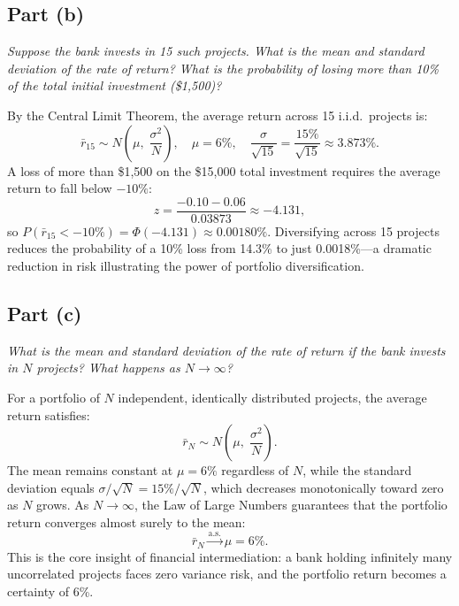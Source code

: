 \documentclass[a4paper]{article}
\begin{document}
\subsection{Part (b)}

\textit{Suppose the bank invests in 15 such projects. What is the mean and
standard deviation of the rate of return? What is the probability of losing
more than 10\% of the total initial investment (\$1,500)?}

\medskip
By the Central Limit Theorem, the average return across 15 i.i.d.\ projects
is:
\[
\bar{r}_{15} \sim N\!\left(\mu,\; \frac{\sigma^{2}}{N}\right),
\quad \mu = 6\%,\quad \frac{\sigma}{\sqrt{15}} = \frac{15\%}{\sqrt{15}}
\approx 3.873\%.
\]
A loss of more than \$1,500 on the \$15,000 total investment requires the
average return to fall below \(-10\%\):
\[
z = \frac{-0.10 - 0.06}{0.03873} \approx -4.131,
\]
so \(P(\bar{r}_{15} < -10\%) = \Phi(-4.131) \approx 0.00180\%\). Diversifying
across 15 projects reduces the probability of a 10\% loss from 14.3\% to
just 0.0018\%---a dramatic reduction in risk illustrating the power of
portfolio diversification.

\subsection{Part (c)}

\textit{What is the mean and standard deviation of the rate of return if the
bank invests in $N$ projects? What happens as $N \to \infty$?}

\medskip
For a portfolio of \(N\) independent, identically distributed projects, the
average return satisfies:
\[
\bar{r}_{N} \sim N\!\left(\mu,\; \frac{\sigma^{2}}{N}\right).
\]
The mean remains constant at \(\mu = 6\%\) regardless of \(N\), while the
standard deviation equals \(\sigma/\sqrt{N} = 15\%/\sqrt{N}\), which
decreases monotonically toward zero as \(N\) grows. As \(N \to \infty\),
the Law of Large Numbers guarantees that the portfolio return converges
almost surely to the mean:
\[
\bar{r}_{N} \xrightarrow{\text{a.s.}} \mu = 6\%.
\]
This is the core insight of financial intermediation: a bank holding
infinitely many uncorrelated projects faces zero variance risk, and the
portfolio return becomes a certainty of 6\%.
\end{document}
